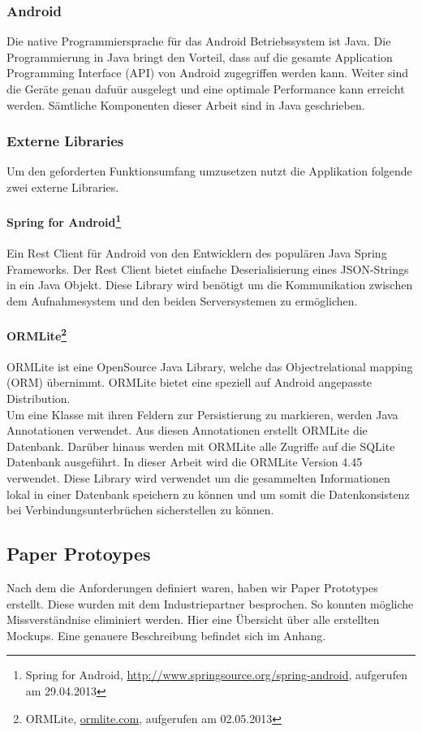 \subsubsection{Android}
Die native Programmiersprache f\"{u}r das Android Betriebssystem ist Java. Die Programmierung in Java bringt den Vorteil, dass auf die gesamte Application Programming Interface (API) von Android zugegriffen werden kann. Weiter sind die Ger\"{a}te genau dafu\"{u}r ausgelegt und eine optimale Performance kann erreicht werden. S\"{a}mtliche Komponenten dieser Arbeit sind in Java geschrieben.

\subsubsection{Externe Libraries}
Um den geforderten Funktionsumfang umzusetzen nutzt die Applikation folgende zwei externe Libraries.
\paragraph{Spring for Android\footnote{Spring for Android, \url{http://www.springsource.org/spring-android}, aufgerufen am 29.04.2013} }
Ein Rest Client für Android von den Entwicklern des populären Java Spring Frameworks. Der Rest Client bietet einfache Deserialisierung eines JSON-Strings in ein Java Objekt. Diese Library wird benötigt um die Kommunikation zwischen dem Aufnahmesystem und den beiden Serversystemen zu ermöglichen.
\paragraph{ORMLite\footnote{ORMLite, \url{ormlite.com}, aufgerufen am 02.05.2013}} ORMLite ist eine OpenSource Java Library, welche das Objectrelational mapping
(ORM) übernimmt. ORMLite bietet eine speziell auf Android angepasste Distribution.\\
Um eine Klasse mit ihren Feldern zur Persistierung zu markieren, werden Java Annotationen verwendet. Aus diesen Annotationen erstellt ORMLite die Datenbank. Darüber hinaus werden mit ORMLite alle Zugriffe auf die SQLite Datenbank ausgeführt. In dieser Arbeit wird die ORMLite Version 4.45 verwendet. Diese Library wird verwendet um die gesammelten Informationen lokal in einer Datenbank speichern zu können und um somit die Datenkonsistenz bei Verbindungsunterbrüchen sicherstellen zu können.

\subsection{Paper Protoypes}
Nach dem die Anforderungen definiert waren, haben wir Paper Prototypes erstellt. Diese wurden mit dem Industriepartner besprochen. So konnten mögliche Missverständnise eliminiert werden. Hier eine Übersicht über alle erstellten Mockups. Eine genauere Beschreibung befindet sich im Anhang.

